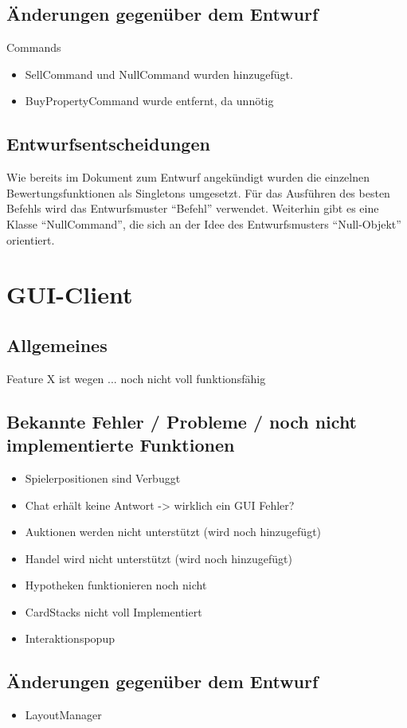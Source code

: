 \documentclass[a4paper,10pt]{article}
\begin{document}
\subsection{Änderungen gegenüber dem Entwurf}
Commands
\begin{itemize}
\item SellCommand und NullCommand wurden hinzugefügt.
\item BuyPropertyCommand wurde entfernt, da unnötig
\end{itemize}
\newpage

\subsection{Entwurfsentscheidungen}
Wie bereits im Dokument zum Entwurf angekündigt wurden die einzelnen Bewertungsfunktionen als Singletons umgesetzt. Für das Ausführen des besten Befehls wird das Entwurfsmuster ``Befehl'' verwendet. Weiterhin gibt es eine Klasse ``NullCommand'', die sich an der Idee des Entwurfsmusters ``Null-Objekt'' orientiert.

\section{GUI-Client}

\subsection{Allgemeines}
Feature X ist wegen ... noch nicht voll funktionsfähig
\subsection{Bekannte Fehler / Probleme / noch nicht implementierte Funktionen}
\begin{itemize}
\item Spielerpositionen sind Verbuggt
\item Chat erhält keine Antwort -> wirklich ein GUI Fehler?
\item Auktionen werden nicht unterstützt (wird noch hinzugefügt)
\item Handel wird nicht unterstützt (wird noch hinzugefügt)
\item Hypotheken funktionieren noch nicht
\item CardStacks nicht voll Implementiert
\item Interaktionspopup
\end{itemize}
\subsection{Änderungen gegenüber dem Entwurf}
\begin{itemize}
\item LayoutManager
\end{itemize}
\end{document}
